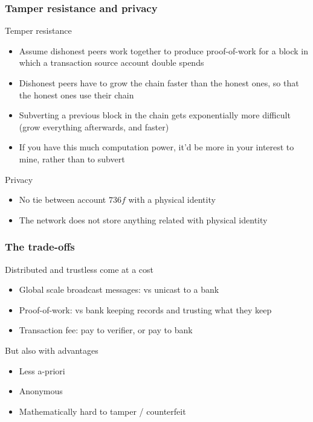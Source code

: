 \documentclass{beamer}
\begin{document}
\begin{frame}
\frametitle{Tamper resistance and privacy}

Temper resistance
\begin{itemize}
  \item Assume dishonest peers work together to produce proof-of-work for a block in which a transaction source account double spends
  \item Dishonest peers have to grow the chain faster than the honest ones, so that the honest ones use their chain
  \item Subverting a previous block in the chain gets exponentially more difficult (grow everything afterwards, and faster)
  \item If you have this much computation power, it'd be more in your interest to mine, rather than to subvert
\end{itemize}

\vspace{0.2in}
Privacy
\begin{itemize}
  \item No tie between account $736f$ with a physical identity
  \item The network does not store anything related with physical identity
\end{itemize}

\end{frame}

\begin{frame}
\frametitle{The trade-offs}

Distributed and trustless come at a cost

\begin{itemize}
  \item Global scale broadcast messages: vs unicast to a bank
  \item Proof-of-work: vs bank keeping records and trusting what they keep
  \item Transaction fee: pay to verifier, or pay to bank
\end{itemize}

\vspace{0.2in}
But also with advantages

\begin{itemize}
  \item Less a-priori
  \item Anonymous
  \item Mathematically hard to tamper / counterfeit
\end{itemize}

\end{frame}
\end{document}
